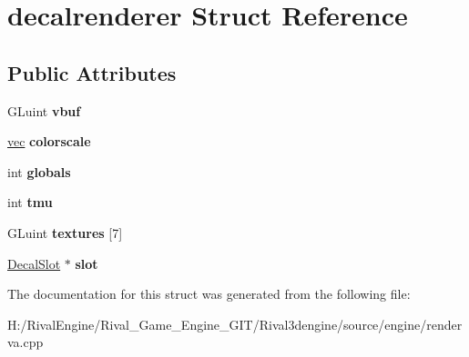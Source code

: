 \hypertarget{structdecalrenderer}{}\section{decalrenderer Struct Reference}
\label{structdecalrenderer}
\subsection*{Public Attributes}
\begin{DoxyCompactItemize}
\item 
\mbox{\label{structdecalrenderer_adfaaeb04fc305f58a585b0f1fb242f68}} 
G\+Luint {\bfseries vbuf}
\item 
\mbox{\label{structdecalrenderer_a284e483a01a01567f2719ff043cf3e6c}} 
\hyperlink{structvec}{vec} {\bfseries colorscale}
\item 
\mbox{\label{structdecalrenderer_a5819a8e64587a5f7e69906d301a784a1}} 
int {\bfseries globals}
\item 
\mbox{\label{structdecalrenderer_ae4d3482f730a9e82493fa62ffe9009a7}} 
int {\bfseries tmu}
\item 
\mbox{\label{structdecalrenderer_add575d0e2fc3c8f24e9b25848496c3a2}} 
G\+Luint {\bfseries textures} \mbox{[}7\mbox{]}
\item 
\mbox{\label{structdecalrenderer_a58d234edeccb4c16b0c8de79ed955d37}} 
\hyperlink{struct_decal_slot}{Decal\+Slot} $\ast$ {\bfseries slot}
\end{DoxyCompactItemize}


The documentation for this struct was generated from the following file\+:\begin{DoxyCompactItemize}
\item 
H\+:/\+Rival\+Engine/\+Rival\+\_\+\+Game\+\_\+\+Engine\+\_\+\+G\+I\+T/\+Rival3dengine/source/engine/renderva.\+cpp\end{DoxyCompactItemize}
